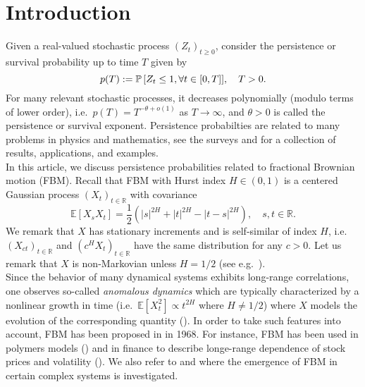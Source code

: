 \documentclass[11pt]{article}
\theoremstyle{plain}
\theoremstyle{definition}
\begin{document}
\section{Introduction}
Given a real-valued stochastic process $(Z_t)_{t \ge 0}$, consider the persistence or survival probability up to time $T$ given by
\begin{equation*}
   p(T) := {{{\bf {\mathbb{P}}}}\left[{ Z_t \leq 1, \forall t \in [0,T]}\right]}, \quad T > 0.
\end{equation*}
For many relevant stochastic processes, it decreases polynomially (modulo terms of lower order), i.e.\ $p(T) = T^{-\theta + o(1)}$ as $T \to \infty$, and $\theta > 0$ is called the persistence or survival exponent. Persistence probabilties are related to many problems in physics and mathematics, see the surveys \cite{majumdar:1999} and \cite{aurzada-simon:2012} for a collection of results, applications, and examples.\\
In this article, we discuss persistence probabilities related to fractional Brownian motion (FBM). Recall that FBM with Hurst index $H \in (0,1)$ is a centered Gaussian process $(X_t)_{t \in \mathbb{R}}$ with covariance 
\[
  {\mathbb{E}\left[{X_s X_t}\right]} = \frac{1}{2} \left( {\lvert{s}\rvert}^{2H} + {\lvert{t}\rvert}^{2H} - {\lvert{t-s}\rvert}^{2H} \right), \quad s,t \in \mathbb{R}.
\]
We remark that $X$ has stationary increments and is self-similar of index $H$, i.e.\ $(X_{ct})_{t \in \mathbb{R}}$ and $(c^H X_t)_{t \in \mathbb{R}}$ have the same distribution for any $c > 0$. Let us remark that $X$ is non-Markovian unless $H=1/2$ (see e.g.\ \cite{mandelbrot-vanness:1968}). \\
Since the behavior of many dynamical systems exhibits long-range correlations, one observes so-called \textit{anomalous dynamics} which are typically characterized by a nonlinear growth in time (i.e.\ ${\mathbb{E}\left[{X_t^2}\right]} \propto t^{2H}$ where $H \neq 1/2$) where $X$ models the evolution of the corresponding quantity (\cite{bouchoud-georges:1990}). In order to take such features into account, FBM has been proposed in \cite{mandelbrot-vanness:1968} in 1968. For instance, FBM has been used in polymers models (\cite{zoia-rosso-majumdar:2009, w-f-c-v:2012}) and in finance to describe longe-range dependence of stock prices and volatility (\cite{comte-renault:1998, oksendal:2007}). We also refer to \cite{eliazar-klafter:2008} and \cite{eliazar-shlesinger:2012} where the emergence of FBM in certain complex systems is investigated.\\
\end{document}
